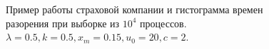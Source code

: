 \documentclass[12pt, a4paper]{article}
\begin{document}
\begin{figure}[H]
\caption{Пример работы страховой компании и гистограмма времен разорения при выборке из $10^4$ процессов. $\lambda = 0.5, k=0.5, x_m=0.15, u_0 = 20, c=2.$}
\end{figure}
\end{document}
